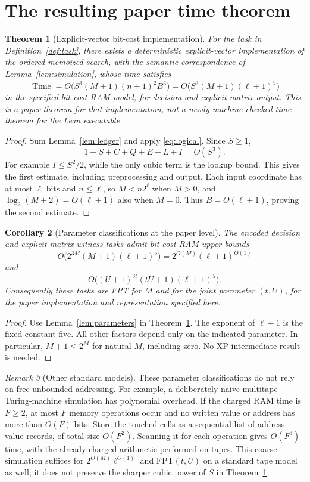 \documentclass[11pt,a4paper]{article}
\newtheorem{theorem}{Theorem}[section]
\newtheorem{corollary}[theorem]{Corollary}
\theoremstyle{definition}
\theoremstyle{remark}
\newtheorem{remark}[theorem]{Remark}
\newcommand{\Time}{\operatorname{Time}}
\begin{document}
\section{The resulting paper time theorem}\label{sec:time}
\begin{theorem}[Explicit-vector bit-cost implementation]\label{thm:time}
For the task in Definition~\ref{def:task}, there exists a deterministic
explicit-vector implementation of the ordered memoized search, with the
semantic correspondence of Lemma~\ref{lem:simulation}, whose time satisfies
\[
 \Time=O\bigl(S^3(M+1)(n+1)^2B^3\bigr)
      =O\bigl(S^3(M+1)(\ell+1)^5\bigr)
\]
in the specified bit-cost RAM model, for decision and explicit matrix output.
This is a paper theorem for that implementation, not a newly machine-checked
time theorem for the Lean executable.
\end{theorem}
\begin{proof}
Sum Lemma~\ref{lem:ledger} and apply \eqref{eq:logical}. Since \(S\ge1\),
\[
 1+S+C+Q+E+L+I=O(S^3).
\]
For example \(I\le S^2/2\), while the only cubic term is the lookup
bound. This gives the first estimate, including preprocessing and output.
Each input coordinate has at most \(\ell\) bits and \(n\le\ell\), so
\(M<n2^\ell\) when \(M>0\), and
\(\log_2(M+2)=O(\ell+1)\) also when \(M=0\).
Thus \(B=O(\ell+1)\), proving the second estimate.
\end{proof}

\begin{corollary}[Parameter classifications at the paper level]
The encoded decision and explicit matrix-witness tasks admit bit-cost RAM
upper bounds
\[
 O\bigl(2^{3M}(M+1)(\ell+1)^5\bigr)
       =2^{O(M)}(\ell+1)^{O(1)}
\]
and
\[
 O\bigl((U+1)^{3t}(tU+1)(\ell+1)^5\bigr).
\]
Consequently these tasks are FPT for \(M\) and for the joint parameter
\((t,U)\), for the paper implementation and representation specified here.
\end{corollary}
\begin{proof}
Use Lemma~\ref{lem:parameters} in Theorem~\ref{thm:time}.
The exponent of \(\ell+1\) is the fixed constant five. All other factors
depend only on the indicated parameter. In particular, \(M+1\le2^M\)
for natural \(M\), including zero. No XP intermediate result is needed.
\end{proof}

\begin{remark}[Other standard models]
These parameter classifications do not rely on free unbounded addressing.
For example, a deliberately naive multitape Turing-machine simulation has
polynomial overhead. If the charged RAM time is \(F\ge2\), at most \(F\)
memory operations occur and no written value or address has more than
\(O(F)\) bits. Store the touched cells as a sequential list of address-value
records, of total size \(O(F^2)\). Scanning it for each operation gives
\(O(F^3)\) time, with the already charged arithmetic performed on tapes.
This coarse simulation suffices for \(2^{O(M)}\ell^{O(1)}\) and FPT\((t,U)\)
on a standard tape model as well; it does not preserve the sharper cubic
power of \(S\) in Theorem~\ref{thm:time}.
\end{remark}
\end{document}
